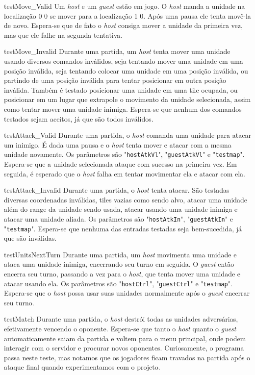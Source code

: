 \begin{itemise}
\teste
    {testMove\_Valid}
    {Um \emph{host} e um \emph{guest} estão em jogo. O \emph{host} manda a unidade na
    localização 0 0 se mover para a localização 1 0. Após uma pausa ele tenta
    movê-la de novo.}
    {Espera-se que de fato o \emph{host} consiga mover a unidade da primeira vez,
    mas que ele falhe na segunda tentativa.}

\teste
    {testMove\_Invalid}
    {Durante uma partida, um \emph{host} tenta mover uma unidade usando diversos
    comandos inválidos, seja tentando mover uma unidade em uma posição inválida,
    seja tentando colocar uma unidade em uma posição inválida, ou partindo de uma
    posição inválida para tentar posicionar em outra posição inválida. Também é
    testado posicionar uma unidade em uma tile ocupada, ou posicionar em um lugar
    que extrapole o movimento da unidade selecionada, assim como tentar mover
    uma unidade inimiga.}
    {Espera-se que nenhum dos comandos testados sejam aceitos, já que são todos
    inválidos.}

\teste
    {testAttack\_Valid}
    {Durante uma partida, o \emph{host} comanda uma unidade para atacar um inimigo.
    É dada uma pausa e o \emph{host} tenta mover e atacar com a mesma unidade
    novamente. Os parâmetros são "\texttt{hostAtkVl}", "\texttt{guestAtkVl}" e
    "\texttt{testmap}".}
    {Espera-se que a unidade selecionada ataque com sucesso na primeira vez.
    Em seguida, é esperado que o \emph{host} falha em tentar movimentar ela e
    atacar com ela.}

\teste
    {testAttack\_Invalid}
    {Durante uma partida, o \emph{host} tenta atacar. São testadas diversas
    coordenadas inválidas, tiles vazias como sendo alvo, atacar uma unidade além do
    range da unidade sendo usada, atacar usando uma unidade inimiga e atacar uma
    unidade aliada. Os parâmetros são "\texttt{hostAtkIn}", "\texttt{guestAtkIn}" e
    "\texttt{testmap}".}
    {Espera-se que nenhuma das entradas testadas seja bem-sucedida, já que são
    inválidas.}

\teste
    {testUnitsNextTurn}
    {Durante uma partida, um \emph{host} movimenta uma unidade e ataca uma unidade
    inimiga, encerrando seu turno em seguida. O \emph{guest} então encerra seu turno,
    passando a vez para o \emph{host}, que tenta mover uma unidade e atacar usando
    ela. Os parâmetros são "\texttt{hostCtrl}", "\texttt{guestCtrl}" e
    "\texttt{testmap}".}
    {Espera-se que o \emph{host} possa usar suas unidades normalmente após o
    \emph{guest} encerrar seu turno.}

\teste
    {testMatch}
    {Durante uma partida, o \emph{host} destrói todas as unidades adversárias, efetivamente vencendo o oponente.}
    {Espera-se que tanto o \emph{host} quanto o \emph{guest} automaticamente saiam da partida e voltem para o menu principal, onde podem interagir com o servidor e procurar novos oponentes. Curiosamente, o programa passa neste teste, mas notamos que os jogadores ficam travados na partida após o ataque final quando experimentamos com o projeto.}


\end{itemise}
